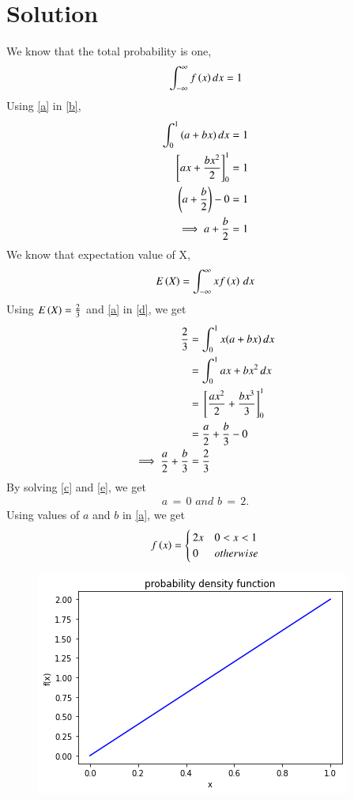 \documentclass[journal,12pt,twocolumn]{IEEEtran}
\begin{document}
\section{Solution}
We know that the total probability is one,
\begin{equation}
    \int_{-\infty}^{\infty}{f\left(x\right) dx} = 1\label{b}
\end{equation}
Using \eqref{a} in \eqref{b},
\begin{align}
    \int_{0}^{1}{(a+bx)\,dx} = 1\\
    {}\left[ax+\frac{bx^2}{2}\right]_0^1=1\\
    \left(a+\frac{b}{2}\right)-0=1\\
    \implies a+\frac{b}{2}=1 \label{c}
\end{align}
We know that expectation value of X,
\begin{align}
    E\left(X\right)=\int_{-\infty}^{\infty}xf\left(x\right)\,dx\label{d}
\end{align}
\newpage
Using $E\left(X\right)=\frac{2}{3}$ and \eqref{a} in \eqref{d}, we get
\begin{align}
     \frac{2}{3}&=\int_{0}^{1}x(a+bx)\,dx\\
     &=\int_{0}^{1} ax+bx^2\,dx\\
     &= {}\left[\frac{ax^2}{2}+\frac{bx^3}{3}\right]_0^1\\
     &= \frac{a}{2}+\frac{b}{3}-0\\
     \implies\frac{a}{2}+\frac{b}{3}&=\frac{2}{3}\label{e}
\end{align}
By solving \eqref{c} and \eqref{e}, we get 
\begin{align}
    a\, =\, 0 \,\,and\,\, b\, =\, 2.
\end{align}
Using values of $a$ and $b$ in \eqref{a}, we get
\begin{align}
f\left(x\right)
= 
\begin{cases}
2x & 0<x<1
\\
0 & otherwise\label{f}\\
\end{cases}
\end{align}
\begin{figure}[htp]
    \centering
    \includegraphics[width=\columnwidth]{assign2.png}
\end{figure}
\end{document}
